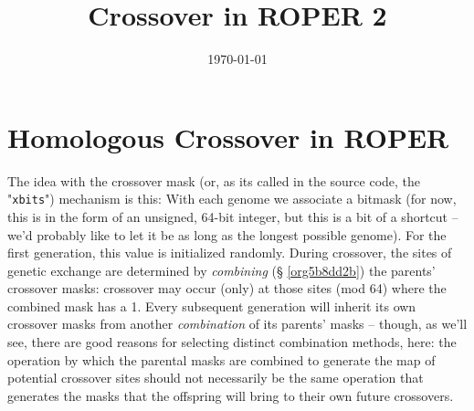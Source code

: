 \documentclass[11pt]{article}
\date{\today}
\title{Crossover in ROPER 2}
\begin{document}
\maketitle
\tableofcontents


\section{Homologous Crossover in ROPER}
\label{sec:org1edc3bd}
The idea with the crossover mask (or, as its called in the source code, the
"\texttt{xbits}") mechanism is this: With each genome we associate a bitmask (for now,
this is in the form of an unsigned, 64-bit integer, but this is a bit of a
shortcut -- we'd probably like to let it be as long as the longest possible
genome). For the first generation, this value is initialized randomly. During
crossover, the sites of genetic exchange are determined by \emph{combining} (\S
\ref{org5b8dd2b}) the parents' crossover masks: crossover may occur (only) at
those sites (mod 64) where the combined mask has a 1. Every subsequent generation
will inherit its own crossover masks from another \emph{combination} of its parents'
masks -- though, as we'll see, there are good reasons for selecting distinct
combination methods, here: the operation by which the parental masks are combined
to generate the map of potential crossover sites should not necessarily be the
same operation that generates the masks that the offspring will bring to their
own future crossovers.
\end{document}
